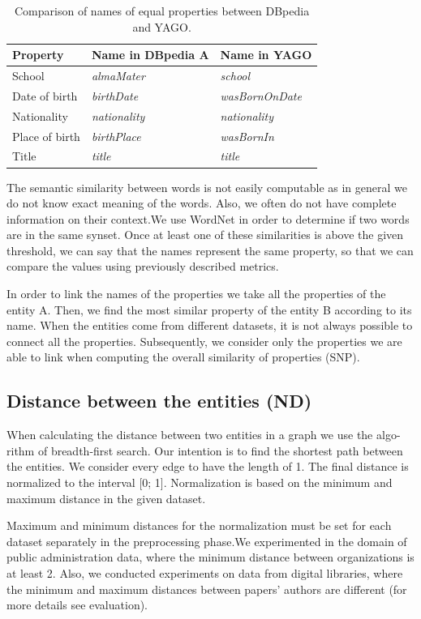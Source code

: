 \documentclass{llncs}
\begin{document}
\begin{table}[ht]
 \centering
 \caption{Comparison of names of equal properties between DBpedia and YAGO.}
 \begin{tabular}{|l|l|l|}
	\hline
Property & Name in DBpedia A & Name in YAGO\\
\hline
\hline
School & \textit{almaMater} & \textit{school}\\
\hline
Date of birth & \textit{birthDate} & \textit{wasBornOnDate}\\
\hline
Nationality &  \textit{nationality} & \textit{nationality} \\
\hline
Place of birth & \textit{birthPlace} & \textit{wasBornIn}\\
 \hline
Title & \textit{title} &	\textit{title}\\
\hline
	\end{tabular}
\end{table}	
The semantic similarity between words is not easily computable as in general we
do not know exact meaning of the words. Also, we often do not have complete
information on their context.We use WordNet in order to determine if two words
are in the same synset. Once at least one of these similarities is above the given
threshold, we can say that the names represent the same property, so that we
can compare the values using previously described metrics.

In order to link the names of the properties we take all the properties of the
entity A. Then, we find the most similar property of the entity B according to its
name. When the entities come from different datasets, it is not always possible
to connect all the properties. Subsequently, we consider only the properties we
are able to link when computing the overall similarity of properties (SNP).

\subsection{Distance between the entities (ND)}

When calculating the distance between two entities in a graph we use the algo-
rithm of breadth-first search. Our intention is to find the shortest path between
the entities. We consider every edge to have the length of 1. The final distance
is normalized to the interval [0; 1]. Normalization is based on the minimum and
maximum distance in the given dataset.

Maximum and minimum distances for the normalization must be set for each
dataset separately in the preprocessing phase.We experimented in the domain of
public administration data, where the minimum distance between organizations
is at least 2. Also, we conducted experiments on data from digital libraries, where
the minimum and maximum distances between papers' authors are different (for
more details see evaluation).
\end{document}

